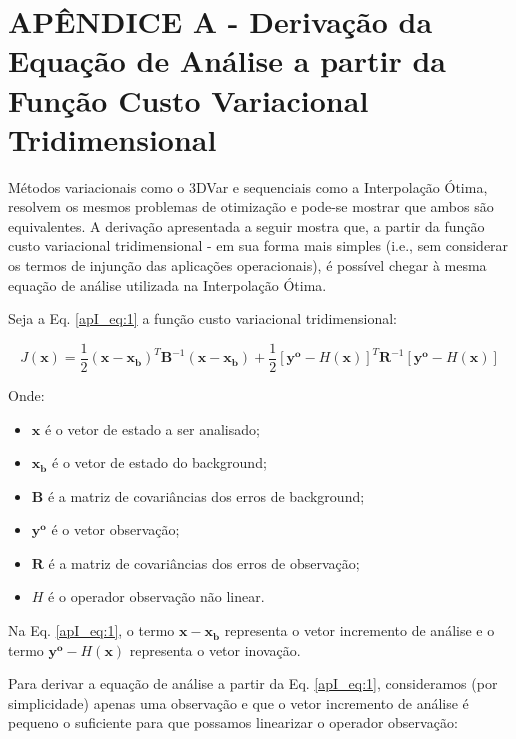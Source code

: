 
\chapter{APÊNDICE A - Derivação da Equação de Análise a partir da Função Custo Variacional Tridimensional}
\label{apendiceI}

Métodos variacionais como o 3DVar e sequenciais como a Interpolação Ótima, resolvem os mesmos problemas de otimização e pode-se mostrar que ambos são equivalentes. A derivação apresentada a seguir mostra que, a partir da função custo variacional tridimensional - em sua forma mais simples (i.e., sem considerar os termos de injunção das aplicações operacionais), é possível chegar à mesma equação de análise utilizada na Interpolação Ótima.

Seja a Eq. \ref{apI_eq:1} a função custo variacional tridimensional:

\begin{equation}
  \label{apI_eq:1}
  J(\mathbf{x}) = \frac{1}{2}(\mathbf{x} - \mathbf{x_{b}})^{T}\mathbf{B}^{-1}(\mathbf{x} - \mathbf{x_{b}}) + \frac{1}{2}[\mathbf{y^o} - \textit{H}(\mathbf{x})]^{T}\mathbf{R}^{-1}[\mathbf{y^o} - \textit{H}(\mathbf{x})]
\end{equation}

Onde:

\begin{itemize}
  \item $\mathbf{x}$ é o vetor de estado a ser analisado;
  \item $\mathbf{x_{b}}$ é o vetor de estado do background;
  \item $\mathbf{B}$ é a matriz de covariâncias dos erros de background;
  \item $\mathbf{y^{o}}$ é o vetor observação;
  \item $\mathbf{R}$ é a matriz de covariâncias dos erros de observação;
  \item $\textit{H}$ é o operador observação não linear.
\end{itemize}

Na Eq. \ref{apI_eq:1}, o termo $\mathbf{x} - \mathbf{x_{b}}$ representa o vetor incremento de análise e o termo $\mathbf{y^{o}} - \textit{H}(\mathbf{x})$ representa o vetor inovação.

Para derivar a equação de análise a partir da Eq. \ref{apI_eq:1}, consideramos (por simplicidade) apenas uma observação e que o vetor incremento de análise é pequeno o suficiente para que possamos linearizar o operador observação:

